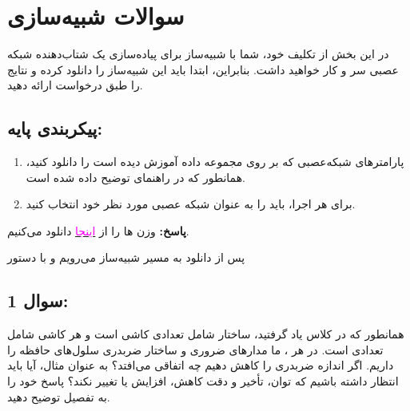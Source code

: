 \documentclass[12pt]{exam}
\begin{document}
\begin{questions}
\begin{enumerate}
\end{enumerate}


		
		
		
		
		
		
	\section*{سوالات شبیه‌سازی}
	\question
	
	
در این بخش از تکلیف خود، شما با شبیه‌ساز  برای پیاده‌سازی یک شتاب‌دهنده شبکه عصبی سر و کار خواهید داشت. بنابراین، ابتدا باید این شبیه‌ساز را دانلود کرده و نتایج را طبق درخواست ارائه دهید.
	
	\subsection*{پیکربندی پایه:}
	\begin{enumerate}
		\item پارامتر‌های شبکه‌عصبی  که بر روی مجموعه داده  آموزش دیده است را دانلود کنید، همانطور که در راهنمای  توضیح داده شده است.
		\item برای هر اجرا، باید  را به عنوان شبکه عصبی مورد نظر خود انتخاب کنید.
	\end{enumerate}
	
	\textbf{پاسخ:} وزن ها را از \href{https://onedrive.live.com/?authkey=%21ANiQIk04073Gdfo&id=8F6F3FD340AC68D1%21332&cid=8F6F3FD340AC68D1}{\textcolor{magenta}{اینجا}}
	دانلود می‌کنیم.
	
	پس از دانلود به مسیر شبیه‌ساز می‌رویم و با دستور 
	
	\subsection*{سوال 1:}
	
	همانطور که در کلاس یاد گرفتید، ساختار  شامل تعدادی کاشی است و هر کاشی شامل تعدادی  است. در هر ، ما مدارهای ضروری و ساختار ضربدری سلول‌های حافظه را داریم. اگر اندازه ضربدری را کاهش دهیم چه اتفاقی می‌افتد؟ به عنوان مثال، آیا باید انتظار داشته باشیم که توان، تأخیر و دقت کاهش، افزایش یا تغییر نکند؟ پاسخ خود را به تفصیل توضیح دهید.
	
	
	

\end{questions}
\end{document}
